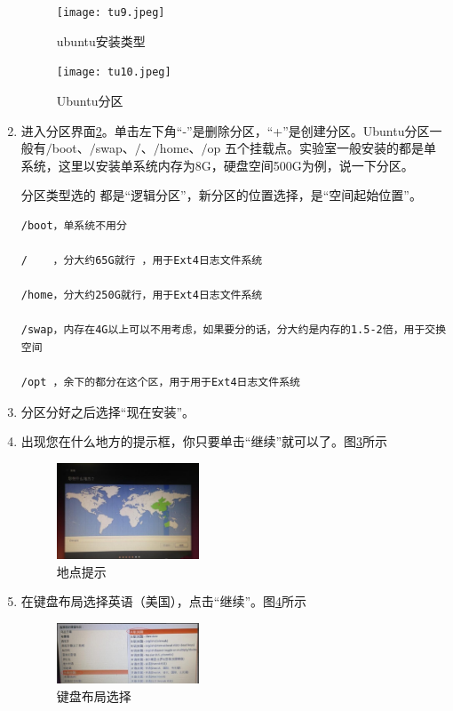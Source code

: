 \documentclass{article}
\begin{document}
\begin{enumerate}
\begin{figure}[!htb] %
\centering
\texttt{[image: tu9.jpeg]}
\caption{\small ubuntu安装类型}
\label{tu9}
\end{figure} 
\begin{figure}[!htb] %
\centering
\texttt{[image: tu10.jpeg]}
\caption{\small Ubuntu分区}
\label{tu10}
\end{figure} 

\item  进入分区界面\ref{tu10}。单击左下角“-”是删除分区，“+”是创建分区。Ubuntu分区一般有$\slash$boot、$\slash$swap、$\slash$、$\slash$home、$\slash$op 五个挂载点。实验室一般安装的都是单系统，这里以安装单系统内存为8G，硬盘空间500G为例，说一下分区。

分区类型选的 都是“逻辑分区”，新分区的位置选择，是“空间起始位置”。

\begin{verbatim}
/boot，单系统不用分

/    ，分大约65G就行 ，用于Ext4日志文件系统

/home，分大约250G就行，用于Ext4日志文件系统

/swap，内存在4G以上可以不用考虑，如果要分的话，分大约是内存的1.5-2倍，用于交换空间

/opt ，余下的都分在这个区，用于用于Ext4日志文件系统
\end{verbatim}

\item   分区分好之后选择“现在安装”。

\item 出现您在什么地方的提示框，你只要单击“继续”就可以了。图\ref{tu12}所示

\begin{figure}[!htb] %
\centering
\includegraphics[width=0.4\textwidth]{tu12.jpeg}
\caption{\small 地点提示}
\label{tu12}
\end{figure} 

\item  在键盘布局选择英语（美国），点击“继续”。图\ref{tu13}所示
\begin{figure}[!htb] %
\centering
\includegraphics[width=0.4\textwidth]{tu13.jpeg}
\caption{\small 键盘布局选择}
\label{tu13}
\end{figure} 


\end{enumerate}
\end{document}

